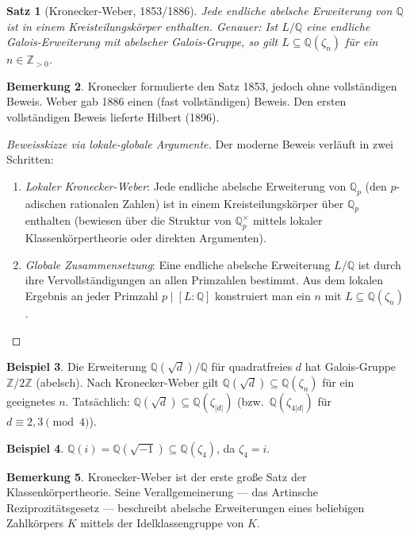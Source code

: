 \documentclass[12pt,a4paper]{amsart}
\newtheorem{theorem}{Satz}[section]
\theoremstyle{definition}
\newtheorem{beispiel}[theorem]{Beispiel}
\newtheorem{bemerkung}[theorem]{Bemerkung}
\newcommand{\Q}{\mathbb{Q}}
\newcommand{\Z}{\mathbb{Z}}
\begin{document}
\begin{theorem}[Kronecker-Weber, 1853/1886]
\label{thm:kronweber}
Jede endliche abelsche Erweiterung von $\Q$ ist in einem Kreisteilungskörper
enthalten. Genauer: Ist $L/\Q$ eine endliche Galois-Erweiterung mit abelscher
Galois-Gruppe, so gilt $L \subseteq \Q(\zeta_n)$ für ein $n \in \Z_{>0}$.
\end{theorem}

\begin{bemerkung}
Kronecker formulierte den Satz 1853, jedoch ohne vollständigen Beweis.
Weber gab 1886 einen (fast vollständigen) Beweis. Den ersten vollständigen
Beweis lieferte Hilbert (1896).
\end{bemerkung}

\begin{proof}[Beweisskizze via lokale-globale Argumente]
Der moderne Beweis verläuft in zwei Schritten:
\begin{enumerate}
  \item \emph{Lokaler Kronecker-Weber}: Jede endliche abelsche Erweiterung von
        $\Q_p$ (den $p$-adischen rationalen Zahlen) ist in einem Kreisteilungskörper
        über $\Q_p$ enthalten (bewiesen über die Struktur von $\Q_p^\times$ mittels
        lokaler Klassenkörpertheorie oder direkten Argumenten).
  \item \emph{Globale Zusammensetzung}: Eine endliche abelsche Erweiterung
        $L/\Q$ ist durch ihre Vervollständigungen an allen Primzahlen bestimmt.
        Aus dem lokalen Ergebnis an jeder Primzahl $p \mid [L:\Q]$ konstruiert
        man ein $n$ mit $L \subseteq \Q(\zeta_n)$.
\end{enumerate}
\end{proof}

\begin{beispiel}
Die Erweiterung $\Q(\sqrt{d})/\Q$ für quadratfreies $d$ hat Galois-Gruppe
$\Z/2\Z$ (abelsch). Nach Kronecker-Weber gilt
$\Q(\sqrt{d}) \subseteq \Q(\zeta_n)$ für ein geeignetes $n$. Tatsächlich:
$\Q(\sqrt{d}) \subseteq \Q(\zeta_{|d|})$ (bzw.\ $\Q(\zeta_{4|d|})$ für
$d \equiv 2,3 \pmod{4}$).
\end{beispiel}

\begin{beispiel}
$\Q(i) = \Q(\sqrt{-1}) \subseteq \Q(\zeta_4)$, da $\zeta_4 = i$.
\end{beispiel}

\begin{bemerkung}
Kronecker-Weber ist der erste große Satz der Klassenkörpertheorie. Seine
Verallgemeinerung — das Artinsche Reziprozitätsgesetz — beschreibt abelsche
Erweiterungen eines beliebigen Zahlkörpers $K$ mittels der Idelklassengruppe
von $K$.
\end{bemerkung}
\end{document}
